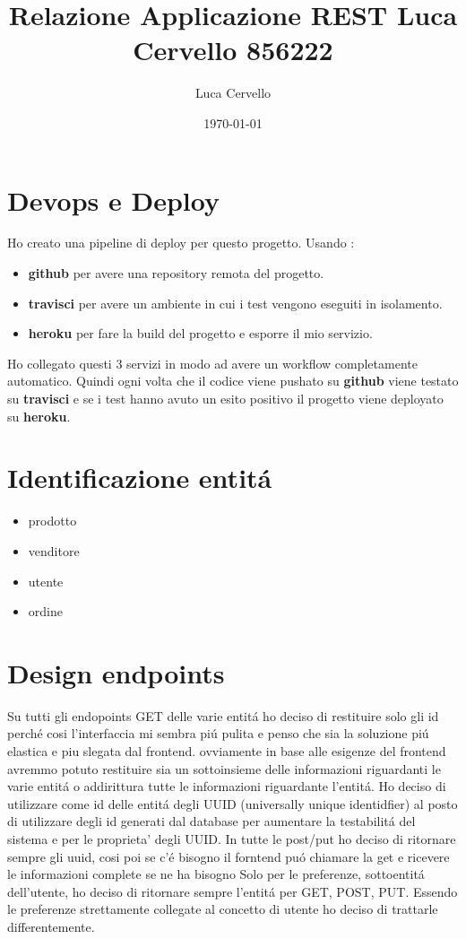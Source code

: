 \documentclass[11pt]{article}
\author{Luca Cervello}
\date{\today}
\title{Relazione Applicazione REST Luca Cervello 856222}
\begin{document}
\maketitle
\tableofcontents


\section{Devops e Deploy}
\label{sec:org23c396f}
Ho creato una pipeline di deploy per questo progetto.
Usando :

\begin{itemize}
\item \textbf{github} per avere una repository remota del progetto.
\item \textbf{travisci} per avere un ambiente in cui i test vengono eseguiti in isolamento.
\item \textbf{heroku} per fare la build del progetto e esporre il mio servizio.
\end{itemize}

Ho collegato questi 3 servizi in modo ad avere un workflow completamente automatico.
Quindi ogni volta che il codice viene pushato su \textbf{github} viene testato su \textbf{travisci}
e se i test hanno avuto un esito positivo il progetto viene deployato su \textbf{heroku}.

\section{Identificazione entitá}
\label{sec:orgc7a6da8}
\begin{itemize}
\item prodotto
\item venditore
\item utente
\item ordine
\end{itemize}
\section{Design endpoints}
\label{sec:org627c16d}
Su tutti gli endopoints GET delle varie entitá ho deciso di restituire solo gli id perché cosi l'interfaccia
mi sembra piú pulita e penso che sia la soluzione piú elastica e piu slegata dal frontend.
ovviamente in base alle esigenze del frontend avremmo potuto restituire sia un sottoinsieme delle informazioni
riguardanti le varie entitá o addirittura tutte le informazioni riguardante l'entitá.
Ho deciso di utilizzare come id delle entitá degli UUID (universally unique identidfier) al posto di utilizzare
degli id generati dal database per aumentare la testabilitá del sistema e per le proprieta' degli UUID.
In tutte le post/put ho deciso di ritornare sempre gli uuid, cosi poi se c'é bisogno il forntend puó chiamare
la get e ricevere le informazioni complete se ne ha bisogno
Solo per le preferenze, sottoentitá dell'utente, ho deciso di ritornare sempre l'entitá per GET, POST, PUT.
Essendo le preferenze strettamente collegate al concetto di utente ho deciso di trattarle differentemente.
\end{document}
